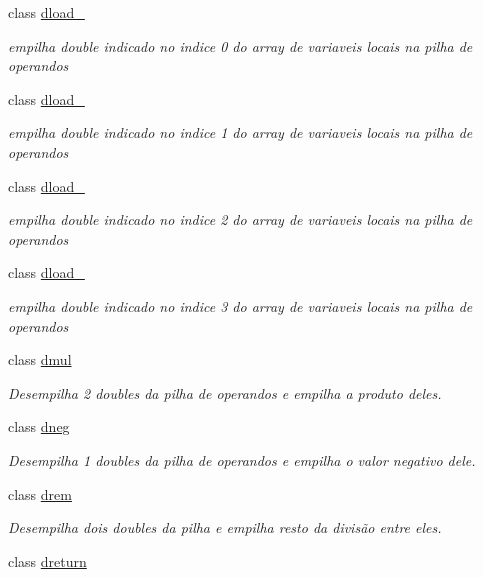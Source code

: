 \begin{DoxyCompactItemize}
class \hyperlink{class_instruction_impl_1_1dload__0}{dload\+\_}
\begin{DoxyCompactList}\small\item\em empilha double indicado no indice 0 do array de variaveis locais na pilha de operandos \end{DoxyCompactList}\item 
class \hyperlink{class_instruction_impl_1_1dload__1}{dload\+\_}
\begin{DoxyCompactList}\small\item\em empilha double indicado no indice 1 do array de variaveis locais na pilha de operandos \end{DoxyCompactList}\item 
class \hyperlink{class_instruction_impl_1_1dload__2}{dload\+\_}
\begin{DoxyCompactList}\small\item\em empilha double indicado no indice 2 do array de variaveis locais na pilha de operandos \end{DoxyCompactList}\item 
class \hyperlink{class_instruction_impl_1_1dload__3}{dload\+\_}
\begin{DoxyCompactList}\small\item\em empilha double indicado no indice 3 do array de variaveis locais na pilha de operandos \end{DoxyCompactList}\item 
class \hyperlink{class_instruction_impl_1_1dmul}{dmul}
\begin{DoxyCompactList}\small\item\em Desempilha 2 doubles da pilha de operandos e empilha a produto deles. \end{DoxyCompactList}\item 
class \hyperlink{class_instruction_impl_1_1dneg}{dneg}
\begin{DoxyCompactList}\small\item\em Desempilha 1 doubles da pilha de operandos e empilha o valor negativo dele. \end{DoxyCompactList}\item 
class \hyperlink{class_instruction_impl_1_1drem}{drem}
\begin{DoxyCompactList}\small\item\em Desempilha dois doubles da pilha e empilha resto da divisão entre eles. \end{DoxyCompactList}\item 
class \hyperlink{class_instruction_impl_1_1dreturn}{dreturn}

\end{DoxyCompactItemize}
